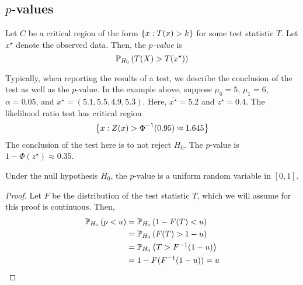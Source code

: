 \subsection{\texorpdfstring{\( p \)}{p}-values}
\begin{definition}
	Let \( C \) be a critical region of the form \( \qty{ x: T(x) > k } \) for some test statistic \( T \).
	Let \( x^\star \) denote the observed data.
	Then, the \textit{\( p \)-value} is
	\[
		\mathbb{P}_{H_0}\left({T(X) > T(x^\star)}\right)
	\]
\end{definition}
Typically, when reporting the results of a test, we describe the conclusion of the test as well as the \( p \)-value.
In the example above, suppose \( \mu_0 = 5 \), \( \mu_1 = 6 \), \( \alpha = 0.05 \), and \( x^\star = (5.1, 5.5, 4.9, 5.3) \).
Here, \( \overline{x^\star} = 5.2 \) and \( z^\star = 0.4 \).
The likelihood ratio test has critical region
\[
	\qty{x: Z(x) > \Phi^{-1}(0.95) \approx 1.645}
\]
The conclusion of the test here is to not reject \( H_0 \).
The \( p \)-value is \( 1 - \Phi(z^\star) \approx 0.35 \).
\begin{proposition}
	Under the null hypothesis \( H_0 \), the \( p \)-value is a uniform random variable in \( [0,1] \).
\end{proposition}
\begin{proof}
	Let \( F \) be the distribution of the test statistic \( T \), which we will assume for this proof is continuous.
	Then,
	\begin{align*}
		\mathbb{P}_{H_0}\left({p < u}\right) & = \mathbb{P}_{H_0}\left({1 - F(T) < u}\right)    \\
		                  & = \mathbb{P}_{H_0}\left({F(T) > 1-u}\right)      \\
		                  & = \mathbb{P}_{H_0}\left({T > F^{-1}(1-u)}\right) \\
		                  & = 1 - F(F^{-1}(1-u)) = u
	\end{align*}
\end{proof}

